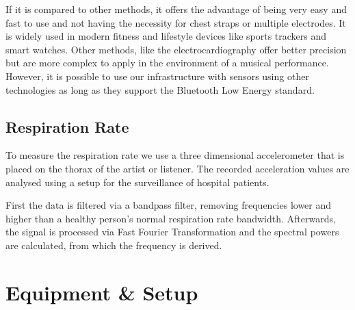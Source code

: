 \documentclass{sigchi-ext}
\begin{document}
If it is compared to other methods, it offers the advantage of being very easy and fast
to use and not having the necessity for chest straps or multiple electrodes. It is widely used
in modern fitness and lifestyle devices like sports trackers and smart watches. Other methods,
like the electrocardiography offer better precision but are more complex to apply in the
environment of a musical performance. However, it is possible to use our infrastructure with sensors using other technologies
as long as they support the Bluetooth Low Energy standard.

\subsection{Respiration Rate}

To measure the respiration rate we use a three dimensional accelerometer that is placed on the thorax
of the artist or listener. The recorded
acceleration values are analysed using a setup for
the surveillance of hospital patients\cite{kurscheidt2016open}.

First the data is filtered via a bandpass filter, removing frequencies lower and higher
than a healthy person's normal respiration rate bandwidth. Afterwards, the signal is processed via
Fast Fourier Transformation and the spectral powers are calculated, from which the frequency is
derived. %

\section{Equipment \& Setup}
\end{document}
